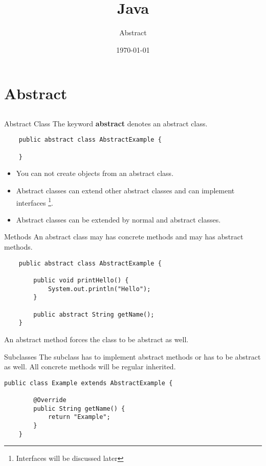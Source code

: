 


\title{Java}
\subtitle{Abstract}
\date{\today}



\begin{frame}
	\titlepage
\end{frame}

\section{Abstract}
\subsection{}
\begin{frame}[fragile]{Abstract Class}
	The keyword \textbf{abstract} denotes an abstract class.
	\vfill
	\begin{lstlisting}
	public abstract class AbstractExample {
	
	}	
	\end{lstlisting}
	\vfill
    \begin{itemize}
	\item You can not create objects from an abstract class.\\
	\item Abstract classes can extend other abstract classes and can implement interfaces \footnote[1]{Interfaces will be discussed later}.\\
	\item Abstract classes can be extended by normal and abstract classes.
    \end{itemize}
\end{frame}

\begin{frame}[fragile]{Methods}
	An abstract class may has concrete methods and may has abstract methods.
	\begin{lstlisting}
	public abstract class AbstractExample {
	
	    public void printHello() {
	        System.out.println("Hello");	    
	    }
	    
	    public abstract String getName();
	}	
	\end{lstlisting}
	An abstract method forces the class to be abstract as well. \\
\end{frame}

\begin{frame}[fragile]{Subclasses}
	The subclass has to implement abstract methods or has to be abstract as well.
	All concrete methods will be regular inherited.
	\begin{lstlisting}[escapechar=!]
	public class Example extends AbstractExample {
	    
	    @Override
	    public String getName() {
	        return "Example";	    
	    }
	}	
	\end{lstlisting}
\end{frame}

